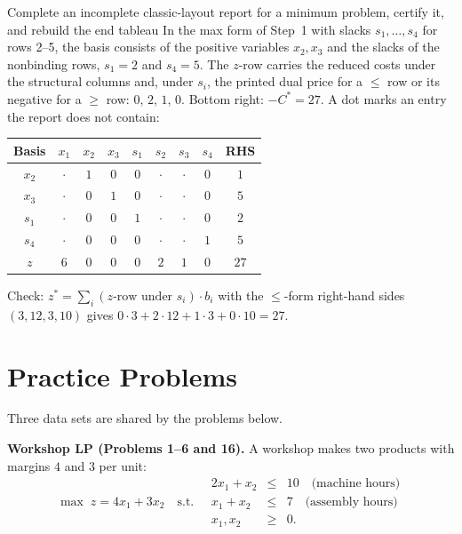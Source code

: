 \begin{worked}{Complete an incomplete classic-layout report for a minimum problem, certify it, and rebuild the end tableau}
In the max form of Step~1 with slacks $s_{1},\dots,s_{4}$ for rows 2--5,
the basis consists of the positive variables $x_{2},x_{3}$ and the slacks of
the nonbinding rows, $s_{1}=2$ and $s_{4}=5$. The $z$-row carries the
reduced costs under the structural columns and, under $s_{i}$, the printed
dual price for a $\le$ row or its negative for a $\ge$ row: $0$, $2$, $1$,
$0$. Bottom right: $-C^{*}=27$. A dot marks an entry the report does not
contain:
\begin{center}\footnotesize
\begin{tabular}{c|ccccccc|c}
Basis & $x_{1}$ & $x_{2}$ & $x_{3}$ & $s_{1}$ & $s_{2}$ & $s_{3}$ & $s_{4}$ & RHS\\
\hline
$x_{2}$ & $\cdot$ & $1$ & $0$ & $0$ & $\cdot$ & $\cdot$ & $0$ & $1$\\
$x_{3}$ & $\cdot$ & $0$ & $1$ & $0$ & $\cdot$ & $\cdot$ & $0$ & $5$\\
$s_{1}$ & $\cdot$ & $0$ & $0$ & $1$ & $\cdot$ & $\cdot$ & $0$ & $2$\\
$s_{4}$ & $\cdot$ & $0$ & $0$ & $0$ & $\cdot$ & $\cdot$ & $1$ & $5$\\
\hline
$z$ & $6$ & $0$ & $0$ & $0$ & $2$ & $1$ & $0$ & $27$\\
\end{tabular}
\end{center}
Check: $z^{*}=\sum_{i}(\text{$z$-row under }s_{i})\cdot b_{i}$ with the
$\le$-form right-hand sides $(3,12,3,10)$ gives
$0\cdot3+2\cdot12+1\cdot3+0\cdot10=27$. \checkmark
\end{worked}

\section{Practice Problems}

Three data sets are shared by the problems below.

\medskip
\noindent\textbf{Workshop LP (Problems 1--6 and 16).} A workshop makes two
products with margins $4$ and $3$ per unit:
\[
  \max\; z=4x_{1}+3x_{2}
  \quad\text{s.t.}\quad
  \begin{array}{rcl}
    2x_{1}+x_{2} &\le& 10 \quad\text{(machine hours)}\\
    x_{1}+x_{2}  &\le& 7  \quad\text{(assembly hours)}\\
    x_{1},x_{2}  &\ge& 0 .
  \end{array}
\]

